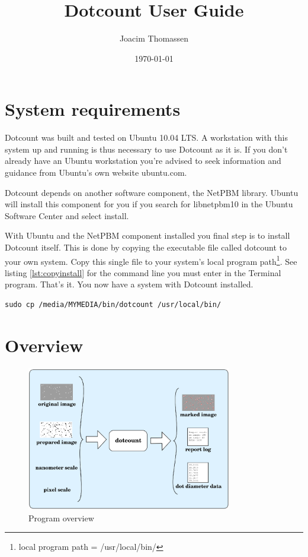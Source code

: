 \documentclass[a4paper,10pt]{book}
\begin{document}
\title{Dotcount User Guide}
\date{\today}
\author{Joacim Thomassen}

\maketitle



\chapter{System requirements}
\label{chap:requirements}
Dotcount was built and tested on Ubuntu 10.04 LTS. A workstation with this
system up and running is thus necessary to use Dotcount as it is. If you don't
already have an Ubuntu workstation you're advised to seek information and
guidance from Ubuntu's own website ubuntu.com.

Dotcount depends on another software component, the NetPBM library. Ubuntu will
install this component for you if you search for libnetpbm10 in the Ubuntu
Software Center and select install. 

With Ubuntu and the NetPBM component installed you final step is to install
Dotcount itself. This is done by copying the executable file called dotcount to
your own system. Copy this single file to your system's local program
path\footnote{local program path = /usr/local/bin/}. See listing
\ref{lst:copyinstall} for the command line you must enter in the Terminal
program. That's it. You now have a system with Dotcount installed.

\begin{lstlisting}[caption={Install program with copy command. Replace
MYMEDIA with the name given to your media containing dotcount.},
label=lst:copyinstall]
sudo cp /media/MYMEDIA/bin/dotcount /usr/local/bin/
\end{lstlisting}


\chapter{Overview}
\label{chap:overview}

\begin{figure}[htb]
  \centering
  \includegraphics[width=0.8\textwidth]{dotcountoverview}
  \caption{Program overview}
  \label{fig:progoverview}
\end{figure}
\end{document}
